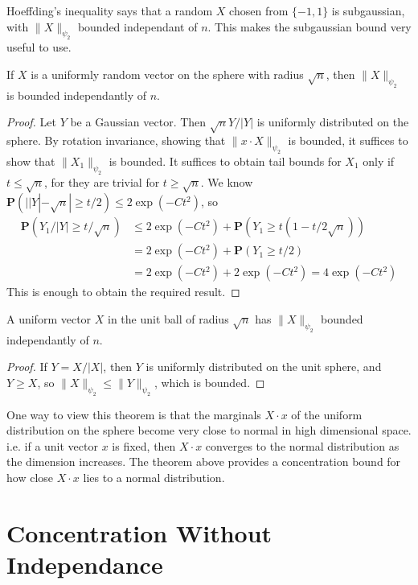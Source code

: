 \begin{example}
    Hoeffding's inequality says that a random $X$ chosen from $\{ -1, 1 \}$ is subgaussian, with $\| X \|_{\psi_2}$ bounded independant of $n$. This makes the subgaussian bound very useful to use.
\end{example}

\begin{theorem}
    If $X$ is a uniformly random vector on the sphere with radius $\sqrt{n}$, then $\| X \|_{\psi_2}$ is bounded independantly of $n$.
\end{theorem}
\begin{proof}
    Let $Y$ be a Gaussian vector. Then $\sqrt{n} Y/|Y|$ is uniformly distributed on the sphere. By rotation invariance, showing that $\| x \cdot X\|_{\psi_2}$ is bounded, it suffices to show that $\| X_1 \|_{\psi_2}$ is bounded. It suffices to obtain tail bounds for $X_1$ only if $t \leq \sqrt{n}$, for they are trivial for $t \geq \sqrt{n}$. We know $\mathbf{P}(||Y| - \sqrt{n}| \geq t/2) \leq 2\exp(-Ct^2)$, so
    \begin{align*}
        \mathbf{P}(Y_1/|Y| \geq t/\sqrt{n}) &\leq 2\exp(-Ct^2) + \mathbf{P}(Y_1 \geq t(1 - t/2 \sqrt{n}))\\
        &= 2 \exp(-Ct^2) + \mathbf{P}(Y_1 \geq t/2)\\
        &= 2 \exp(-Ct^2) + 2 \exp(-Ct^2) = 4\exp(-Ct^2)
    \end{align*}
    This is enough to obtain the required result.
\end{proof}

\begin{corollary}
    A uniform vector $X$ in the unit ball of radius $\sqrt{n}$ has $\| X \|_{\psi_2}$ bounded independantly of $n$.
\end{corollary}
\begin{proof}
    If $Y = X/|X|$, then $Y$ is uniformly distributed on the unit sphere, and $Y \geq X$, so $\| X \|_{\psi_2} \leq \| Y \|_{\psi_2}$, which is bounded.
\end{proof}

One way to view this theorem is that the marginals $X \cdot x$ of the uniform distribution on the sphere become very close to normal in high dimensional space. i.e. if a unit vector $x$ is fixed, then $X \cdot x$ converges to the normal distribution as the dimension increases. The theorem above provides a concentration bound for how close $X \cdot x$ lies to a normal distribution.

\section{Concentration Without Independance}

